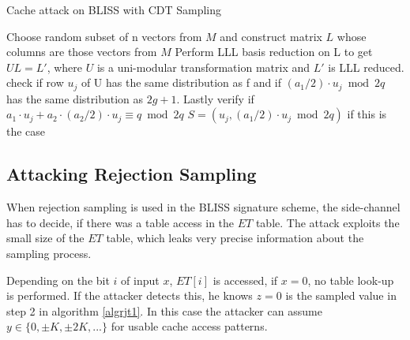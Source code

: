 \begin{algorithm}
	\caption{Cache attack on BLISS with CDT Sampling}
	\label{algcdtattack}
	\begin{algorithmic}[1]
		\EndIf
		\EndFor
		\EndWhile
			\State Choose random subset of n vectors from $M$ and construct matrix $L$ whose columns are those vectors from $M$
			\State Perform LLL basis reduction on L to get $UL = L'$, where $U$ is a uni-modular transformation matrix and $L'$ is LLL reduced.
				\State check if row $u_j$ of U has the same distribution as f and if $(a_1/2)\cdot u_j \bmod 2q$ has the same distribution as $2g+1$. Lastly verify if $a_1 \cdot u_j + a_2 \cdot (a_2/2)\cdot u_j \equiv q \bmod 2q$
				\State
				\Return $S = (u_j, (a_1/2)\cdot u_j \bmod 2q)$ if this is the case
			\EndFor
		\EndWhile
	\end{algorithmic}
\end{algorithm} 
\subsection{Attacking Rejection Sampling} \label{rejection}
When rejection sampling is used in the \ac{BLISS} signature scheme, the side-channel has to decide, if there was a table access in the $ET$ table. The attack exploits the small size of the $ET$ table, which leaks very precise information about the sampling process.

Depending on the bit $i$ of input $x$, $ET[i]$ is accessed, if $x = 0$, no table look-up is performed. If the attacker detects this, he knows $z=0$ is the sampled value in step 2 in algorithm \ref{algrjt1}. In this case the attacker can assume $y \in \{0, \pm K, \pm 2K,...\}$ for usable cache access patterns.

